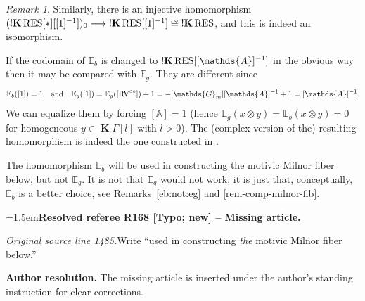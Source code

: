 \documentclass[12pt]{amsart}
\newcommand{\ResolvedRefereeRemark}[5]{%
  \par\medskip\begingroup\normalfont\small\color{gray}%
  \emergencystretch=1.5em\noindent\textbf{Resolved referee R#1 [#2] -- #3.}\par\nobreak\noindent #4\par
  \medskip\color{ResolutionGreen}\noindent\textbf{Author resolution.} #5\par
  \endgroup\medskip
}
\theoremstyle{plain}
\theoremstyle{definition}
\theoremstyle{remark}
\newtheorem{rem}[thm]{Remark}
\numberwithin{equation}{section}
\theoremstyle{plain}
\newcommand{\RV}{\textup{RV}}
\newcommand{\A}{\mathds{A}}
\newcommand{\G}{\mathds{G}}
\newcommand{\dand}{\quad \text{and} \quad}
\newcommand{\0}{\emptyset}
\newcommand{\bb}[1]{\mathbb{#1}}
\newcommand{\fun}{\longrightarrow}
\newcommand{\RES}{\textup{RES}}
\DeclareMathOperator{\ggk}{\mathbf{K}}
\DeclareMathOperator{\sggk}{!\mathbf{K}}
\begin{document}
\begin{rem}
Similarly, there is an injective homomorphism $(\sggk \RES[*][[1]^{-1}])_0 \fun \sggk \RES[[1]^{-1}] \cong \sggk \RES$, and this is indeed an isomorphism.

If the codomain of $\bb E_b$ is changed to $\sggk \RES[[\A]^{-1}]$ in the obvious way then it may be compared with $\bb E_g$. They are different since
\begin{equation}\label{eb:neq:eg:counter}
\bb E_b([1]) = 1 \dand \bb E_g([1]) = \bb E_g([\RV^{\circ\circ}]) + 1 = -[\G_m][\A]^{-1} + 1 = [\A]^{-1}.
\end{equation}
\label{review:section4:positive-degree:start}
We can equalize them by forcing $[\A] = 1$ (hence $\bb E_{g}(x \otimes y) = \bb E_{b}(x \otimes y) = 0$ for homogeneous $y \in \ggk \Gamma[l]$ with $l>0$). The (complex version of the) resulting homomorphism is indeed the one constructed in \cite[(2.5.7)]{hru:loe:lef}.
\label{review:section4:positive-degree:end}
\end{rem}

The homomorphism $\bb E_b$ will be used in constructing the motivic Milnor fiber below, but not $\bb E_g$. It is not that  $\bb E_g$ would not work; it is just that, conceptually, $\bb E_b$ is a better choice,  see Remarks~\ref{eb:not:eg} and \ref{rem-comp-milnor-fib}.

\ResolvedRefereeRemark{168}{Typo; new}{Missing article}{%
\textit{Original source line 1485.}\quad Write ``used in constructing \emph{the} motivic Milnor fiber below.''
}{The missing article is inserted under the author's standing instruction for clear corrections.}


\end{document}
